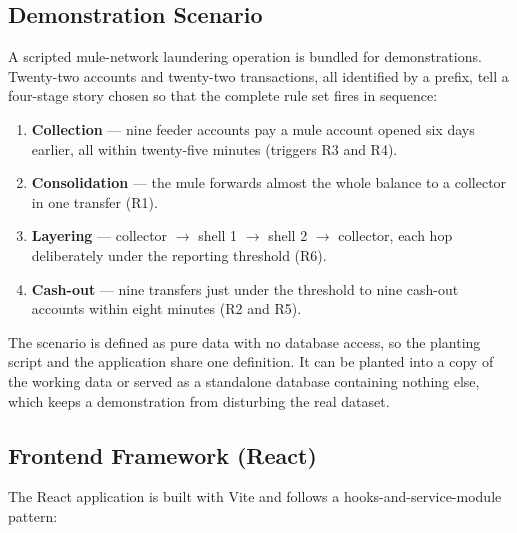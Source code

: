 \subsection{Demonstration Scenario}\label{sec:demo}
A scripted mule-network laundering operation is bundled for demonstrations. Twenty-two accounts and twenty-two transactions, all identified by a  prefix, tell a four-stage story chosen so that the complete rule set fires in sequence:

\begin{enumerate}
  \item \textbf{Collection} --- nine feeder accounts pay a mule account opened six days earlier, all within twenty-five minutes (triggers R3 and R4).
  \item \textbf{Consolidation} --- the mule forwards almost the whole balance to a collector in one transfer (R1).
  \item \textbf{Layering} --- collector $\rightarrow$ shell 1 $\rightarrow$ shell 2 $\rightarrow$ collector, each hop deliberately under the reporting threshold (R6).
  \item \textbf{Cash-out} --- nine transfers just under the threshold to nine cash-out accounts within eight minutes (R2 and R5).
\end{enumerate}

The scenario is defined as pure data with no database access, so the planting script and the application share one definition. It can be planted into a copy of the working data or served as a standalone database containing nothing else, which keeps a demonstration from disturbing the real dataset.

\subsection{Frontend Framework (React)}
The React application is built with Vite and follows a hooks-and-service-module pattern:

